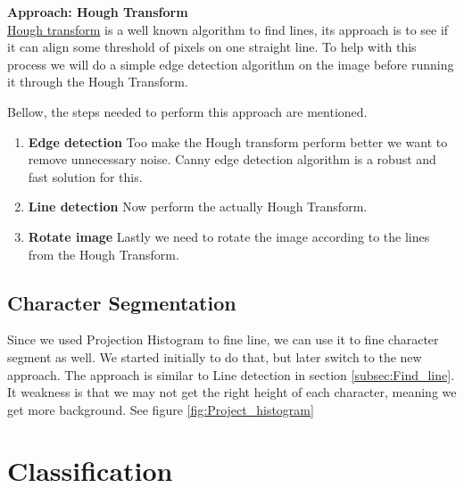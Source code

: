 \documentclass[Report.tex]{subfiles}
\begin{document}
\begin{flushleft}
  \textbf{Approach: Hough Transform} \\
  \href{https://en.wikipedia.org/wiki/Hough_transform}{Hough transform} is a well known algorithm to find lines, its approach is to see if it can align some threshold of pixels on one straight line. To help with this process we will do a simple edge detection algorithm on the image before running it through the Hough Transform. \par Bellow, the steps needed to perform this approach are mentioned.

  \begin{enumerate}
    \item \textbf{Edge detection}
    Too make the Hough transform perform better we want to remove unnecessary noise. Canny edge detection algorithm is a robust and fast solution for this.
    \item \textbf{Line detection}
    Now perform the actually Hough Transform.
    \item \textbf{Rotate image}
    Lastly we need to rotate the image according to the lines from the Hough Transform.
  \end{enumerate}
\end{flushleft}

\subsection{Character Segmentation}
Since we used Projection Histogram to fine line, we can use it to fine character segment as well. We started initially to do that, but later switch to the new approach. The approach is similar to Line detection in section \ref{subsec:Find_line}. It weakness is that we may not get the right height of each character, meaning we get more background. See figure \ref{fig:Project_histogram}


\section{Classification}
\label{sec:Discarded Method:Classification}
\end{document}
